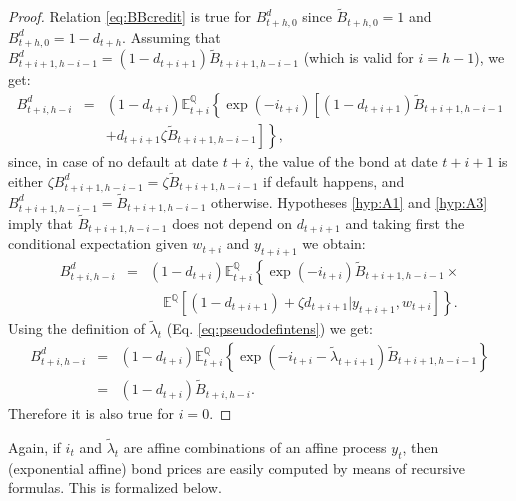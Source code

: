 \documentclass[
  12pt,
]{book}
\theoremstyle{definition}
\theoremstyle{definition}
\theoremstyle{definition}
\theoremstyle{definition}
\theoremstyle{remark}
\begin{document}
\begin{proof}
Relation \eqref{eq:BBcredit} is true for \(B_{t+h,0}^d\) since \(\widetilde{B}_{t+h,0} = 1\) and \(B_{t+h,0}^d = 1 - d_{t+h}\).
Assuming that \(B_{t+i+1, h-i-1}^d = (1 - d_{t+i+1} ) \widetilde{B}_{t+i+1,h-i-1}\) (which is valid for \(i=h-1\)), we get:
\begin{eqnarray*}
B_{t+i, h-i}^d &=& \left(1 - d_{t+i} \right)  \mathbb{E}_{t+i}^{\mathbb{Q}} \left\{ \exp(- i_{t+i})   \left[ \left(1 - d_{t+i+1} \right) \widetilde{B}_{t+i+1,h-i-1} \right. \right. \\
&& \left. \left. +  d_{t+i+1}\zeta\widetilde{B}_{t+i+1,h-i-1} \right] \right\},
\end{eqnarray*}
since, in case of no default at date \(t+i\), the value of the bond at date \(t+i+1\) is either \(\zeta B_{t+i+1, h-i-1}^d = \zeta \widetilde{B}_{t+i+1,h-i-1}\) if default happens, and \(B_{t+i+1, h-i-1}^d = \widetilde{B}_{t+i+1,h-i-1}\) otherwise. Hypotheses \ref{hyp:A1} and \ref{hyp:A3} imply that \(\widetilde{B}_{t+i+1,h-i-1}\) does not depend on \(d_{t+i+1}\) and taking first the conditional expectation given \(w_{t+i}\) and \(y_{t+i+1}\) we obtain:
\begin{equation}
\begin{array}{lll}
B_{t+i, h-i}^d &=& \left(1 - d_{t+i} \right) \mathbb{E}_{t+i}^{\mathbb{Q}} \left\{ \exp(- i_{t+i})  \widetilde{B}_{t+i+1,h-i-1} \times \right. \\
&& \quad\left. \mathbb{E}^{\mathbb{Q}} \left[ \left(1 - d_{t+i+1} \right) +  \zeta d_{t+i+1}  | y_{t+i+1}, w_{t+i} \right] \right\} .
\end{array}\label{eq:Prop21demo}
\end{equation}
Using the definition of \(\widetilde{\lambda}_{t}\) (Eq. \eqref{eq:pseudodefintens}) we get:
\begin{equation*}
\begin{array}{lll}
B_{t+i, h-i}^d &=& \left(1 - d_{t+i} \right)  \mathbb{E}_{t+i}^{\mathbb{Q}} \left\{ \exp \left( - i_{t+i} - \widetilde{\lambda}_{t+i+1} \right)  \widetilde{B}_{t+i+1,h-i-1} \right\}\\
&=& \left(1 - d_{t+i} \right)   \widetilde{B}_{t+i,h-i} .
\end{array}
\end{equation*}
Therefore it is also true for \(i=0\).
\end{proof}

Again, if \(i_t\) and \(\tilde\lambda_t\) are affine combinations of an affine process \(y_t\), then (exponential affine) bond prices are easily computed by means of recursive formulas. This is formalized below.
\end{document}
